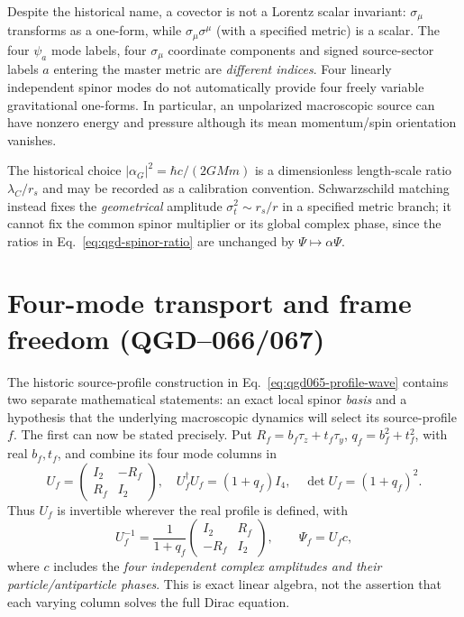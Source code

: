 \documentclass[11pt,a4paper]{article}
\begin{document}
Despite the historical name, a covector is not a Lorentz scalar invariant: $\sigma_\mu$ transforms as a one-form, while $\sigma_\mu\sigma^\mu$ (with a specified metric) is a scalar. The four $\psi_a$ mode labels, four $\sigma_\mu$ coordinate components and signed source-sector labels $a$ entering the master metric are \emph{different indices}. Four linearly independent spinor modes do not automatically provide four freely variable gravitational one-forms. In particular, an unpolarized macroscopic source can have nonzero energy and pressure although its mean momentum/spin orientation vanishes.

The historical choice $|\alpha_G|^2=\hbar c/(2GMm)$ is a dimensionless length-scale ratio $\lambda_C/r_s$ and may be recorded as a calibration convention. Schwarzschild matching instead fixes the \emph{geometrical} amplitude $\sigma_t^2\sim r_s/r$ in a specified metric branch; it cannot fix the common spinor multiplier or its global complex phase, since the ratios in Eq.~\eqref{eq:qgd-spinor-ratio} are unchanged by $\Psi\mapsto\alpha\Psi$.


\section{Four-mode transport and frame freedom (QGD--066/067)}\label{sec:qgd075-mode-frame}
The historic source-profile construction in Eq.~\eqref{eq:qgd065-profile-wave}
contains two separate mathematical statements: an exact local spinor \emph{basis}
and a hypothesis that the underlying macroscopic dynamics will select its
source-profile $f$.  The first can now be stated precisely. Put
$R_f=b_f\tau_z+t_f\tau_y$, $q_f=b_f^2+t_f^2$, with real $b_f,t_f$, and
combine its four mode columns in
\begin{equation}\label{eq:qgd075-Uf}
 \boxed{U_f=\begin{pmatrix}I_2&-R_f\\R_f&I_2\end{pmatrix},\quad
 U_f^\dagger U_f=(1+q_f)I_4,\quad
 \det U_f=(1+q_f)^2.}
\end{equation}
Thus $U_f$ is invertible wherever the real profile is defined, with
\begin{equation}\label{eq:qgd075-Uf-inv}
 U_f^{-1}=\frac{1}{1+q_f}
 \begin{pmatrix}I_2&R_f\\-R_f&I_2\end{pmatrix},\qquad
 \Psi_f=U_f c,
\end{equation}
where $c$ includes the \emph{four independent complex amplitudes and their
particle/antiparticle phases}.  This is exact linear algebra, not the assertion
that each varying column solves the full Dirac equation.
\end{document}
